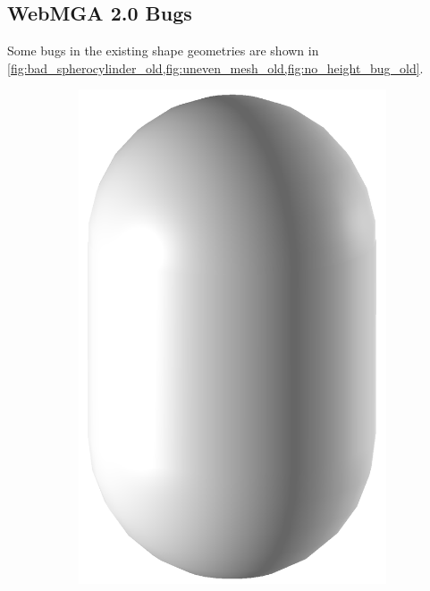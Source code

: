 \subsection{WebMGA 2.0 Bugs}
Some bugs in the existing shape geometries are shown in \cref{fig:bad_spherocylinder_old,fig:uneven_mesh_old,fig:no_height_bug_old}.
\begin{figure}
  \begin{center}
    \begin{subfigure}{0.24\textwidth}
    \includegraphics[width=\linewidth]{assets/images/shapes/bugold/bad_mesh_high}
    \caption{}
    \end{subfigure}

\end{center}
\end{figure}

